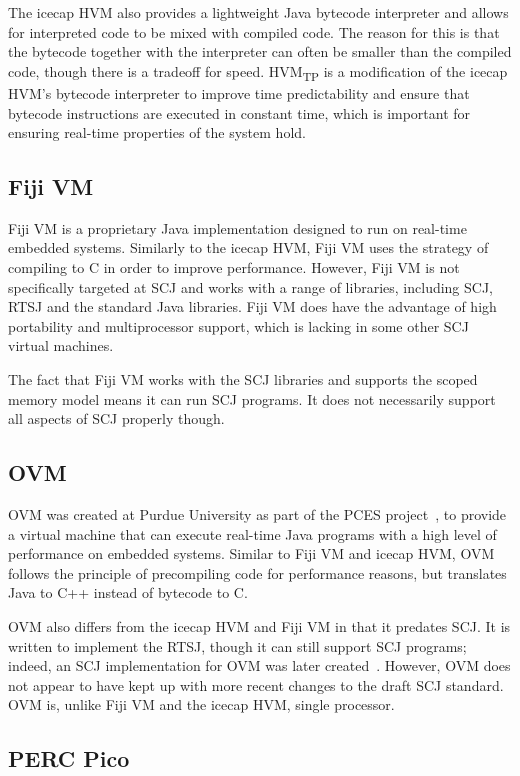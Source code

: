 The icecap HVM also provides a lightweight Java bytecode interpreter
and allows for interpreted code to be mixed with compiled code.
The reason for this is that the bytecode together with the interpreter
can often be smaller than the compiled code, though there is a
tradeoff for speed.
HVM\textsubscript{TP} is a modification of the icecap HVM's bytecode
interpreter to improve time predictability and ensure that bytecode
instructions are executed in constant time, which is important for
ensuring real-time properties of the system hold.

\subsection{Fiji VM}

Fiji VM is a proprietary Java implementation designed to run on
real-time embedded systems.
Similarly to the icecap HVM, Fiji VM uses the strategy of compiling to
C in order to improve performance.
However, Fiji VM is not specifically targeted at SCJ and works with a
range of libraries, including SCJ, RTSJ and the standard Java
libraries.
Fiji VM does have the advantage of high portability and multiprocessor
support, which is lacking in some other SCJ virtual machines.

The fact that Fiji VM works with the SCJ libraries and supports the
scoped memory model means it can run SCJ programs.
It does not necessarily support all aspects of SCJ properly though.

\subsection{OVM}

OVM was created at Purdue University as part of the PCES
project~\cite{baker2006}, to provide a virtual machine that can
execute real-time Java programs with a high level of performance on
embedded systems.
Similar to Fiji VM and icecap HVM, OVM follows the principle of
precompiling code for performance reasons, but translates Java to C++
instead of bytecode to C.

OVM also differs from the icecap HVM and Fiji VM in that it predates
SCJ.
It is written to implement the RTSJ, though it can still support SCJ
programs; indeed, an SCJ implementation for OVM was later
created~\cite{plsek2010}.
However, OVM does not appear to have kept up with more recent changes
to the draft SCJ standard.
OVM is, unlike Fiji VM and the icecap HVM, single processor.

\subsection{PERC Pico}

